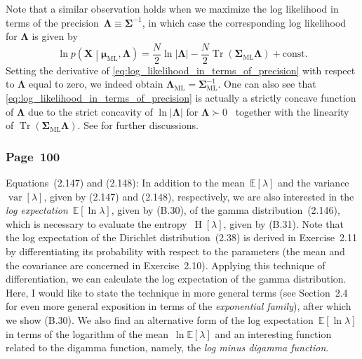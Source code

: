 \documentclass[12pt,a4paper]{article}
\newcommand{\erratum}[1]{%
\subsubsection*{#1}
\addcontentsline{toc}{subsection}{#1}}
\begin{document}
Note that a similar observation holds when we maximize the log likelihood in terms of
the precision~$\bm{\Lambda} \equiv \bm{\Sigma}^{-1}$,
in which case the corresponding log likelihood for $\bm{\Lambda}$ is given by
\begin{equation}
\ln p\left(\mathbf{X}\middle|\bm{\mu}_\text{ML}, \bm{\Lambda}\right)
= \frac{N}{2} \ln\left|\bm{\Lambda}\right|
- \frac{N}{2}\operatorname{Tr}\left(\bm{\Sigma}_\text{ML} \bm{\Lambda}\right)
+ \text{const} .
\label{eq:log_likelihood_in_terms_of_precision}
\end{equation}
Setting the derivative of \eqref{eq:log_likelihood_in_terms_of_precision}
with respect to $\bm{\Lambda}$ equal to zero,
we indeed obtain $\bm{\Lambda}_\text{ML} = \bm{\Sigma}_\text{ML}^{-1}$.
One can also see that \eqref{eq:log_likelihood_in_terms_of_precision} is actually
a strictly concave function of $\bm{\Lambda}$
due to the strict concavity of $\ln\left|\bm{\Lambda}\right|$
for $\bm{\Lambda} \succ 0$~\citep{MagnusNeudecker:MDC}
together with the linearity of $\operatorname{Tr}\left(\bm{\Sigma}_\text{ML} \bm{\Lambda}\right)$.
See \citet{Anderson:MaximumLikelihood} for further discussions.

\erratum{Page~100}
Equations~(2.147) and (2.148):
In addition to the mean~$\mathbb{E}[\lambda]$ and
the variance~$\operatorname{var}[\lambda]$, given by (2.147) and (2.148), respectively,
we are also interested in
the \emph{log expectation}~$\mathbb{E}\left[ \ln\lambda \right]$, given by (B.30),
of the gamma distribution~(2.146),
which is necessary to evaluate
the entropy~$\operatorname{H}\left[ \lambda \right]$, given by (B.31).
Note that the log expectation of the Dirichlet distribution~(2.38) is
derived in Exercise~2.11 by differentiating its probability with respect to the parameters
(the mean and the covariance are concerned in Exercise~2.10).
Applying this technique of differentiation,
we can calculate the log expectation of the gamma distribution.
Here, I would like to state the technique in more general terms
(see Section~2.4 for even more general exposition in terms of the \emph{exponential family}),
after which we show (B.30).
We also find an alternative form of the log expectation~$\mathbb{E}\left[ \ln\lambda \right]$
in terms of the logarithm of the mean~$\ln\mathbb{E}[\lambda]$ and
an interesting function related to the digamma function, namely,
the \emph{log minus digamma function}.
\end{document}
